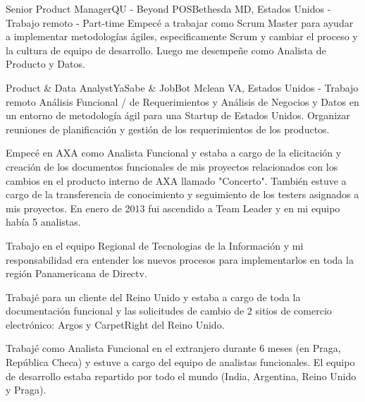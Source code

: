 \documentclass[11pt,a4paper,sans]{moderncv}
\begin{document}
 {Senior Product Manager}{QU - Beyond POS}{Bethesda MD, Estados Unidos - Trabajo remoto - Part-time }{}{}{}
Empecé a trabajar como Scrum Master para ayudar a implementar metodologías ágiles, especificamente Scrum y cambiar el proceso y la cultura de equipo de desarrollo. Luego me desempeñe como Analista de Producto y Datos.
\newline
\newline

 {Product \& Data Analyst}{YaSabe \& JobBot  }{Mclean VA,  Estados Unidos - Trabajo remoto}{}{}{}
Análisis Funcional / de Requerimientos y Análisis de Negocios y Datos en un entorno de metodología ágil para una Startup de Estados Unidos. Organizar reuniones de planificación y gestión de los requerimientos de los productos.
\newline
\newline


Empecé en AXA como Analista Funcional y estaba a cargo de la elicitación y creación de los documentos funcionales de mis proyectos relacionados con los cambios en el producto interno de AXA llamado "Concerto". También estuve a cargo de la transferencia de conocimiento y seguimiento de los testers asignados a mis proyectos. En enero de 2013 fui ascendido a Team Leader y en mi equipo había 5 analistas.
\newline
\newline

Trabajo en el equipo Regional de Tecnologias de la Información y mi responsabilidad era entender los nuevos procesos para implementarlos en toda la región Panamericana de Directv.
\newline

Trabajé para un cliente del Reino Unido y estaba a cargo de toda la documentación funcional y las solicitudes de cambio de 2 sitios de comercio electrónico: Argos y CarpetRight del Reino Unido.
\newline
\newline

Trabajé como Analista Funcional en el extranjero durante 6 meses (en Praga, República Checa) y estuve a cargo del equipo de analistas funcionales. El equipo de desarrollo estaba repartido por todo el mundo (India, Argentina, Reino Unido y Praga).
\newline
\newline
\end{document}
